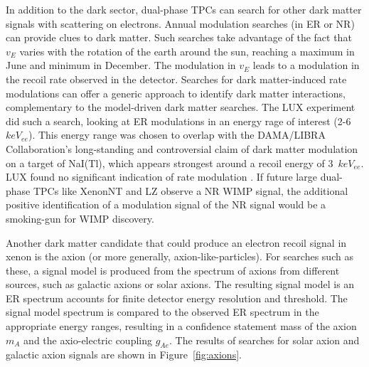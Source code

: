 In addition to the dark sector, dual-phase \ac{TPC}s can search for other dark matter signals with scattering on electrons. Annual modulation searches (in \ac{ER} or \ac{NR}) can provide clues to dark matter. Such searches take advantage of the fact that $v_{E}$ varies with the rotation of the earth around the sun, reaching a maximum in June and minimum in December. The modulation in $v_{E}$ leads to a modulation in the recoil rate observed in the detector. Searches for dark matter-induced rate modulations can offer a generic approach to identify dark matter interactions, complementary to the model-driven dark matter searches. The \ac{LUX} experiment did such a search, looking at \ac{ER} modulations in an energy rage of interest (2-6~$keV_{ee}$). This energy range was chosen to overlap with the DAMA/LIBRA Collaboration's long-standing and controversial claim of dark matter modulation on a target of NaI(Tl), which appears strongest around a recoil energy of 3~$keV_{ee}$. \ac{LUX} found no significant indication of rate modulation \cite{LUXModulation}. If future large dual-phase \ac{TPC}s like XenonNT and LZ observe a \ac{NR} \ac{WIMP} signal, the additional positive identification of a modulation signal of the \ac{NR} signal would be a smoking-gun for \ac{WIMP} discovery. 

Another dark matter candidate that could produce an electron recoil signal in xenon is the axion (or more generally, axion-like-particles). For searches such as these, a signal model is produced from the spectrum of axions from different sources, such as galactic axions or solar axions. The resulting signal model is an \ac{ER} spectrum accounts for finite detector energy resolution and threshold. The signal model spectrum is compared to the observed \ac{ER} spectrum in the appropriate energy ranges, resulting in a confidence statement mass of the axion $m_{A}$ and the axio-electric coupling $g_{Ae}$. The results of searches for solar axion and galactic axion signals are shown in Figure~\ref{fig:axions}.


